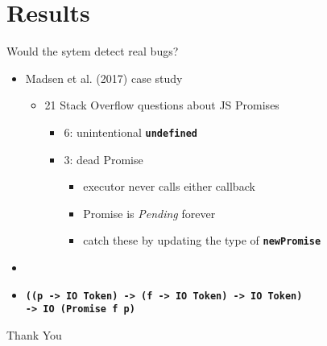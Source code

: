 \documentclass{beamer}
\newcommand{\lit}[1]{\textbf{\texttt{#1}}}
\begin{document}
\section{Results}

\begin{frame}
  \centering{\Large \insertsection}
\end{frame}


\begin{frame}
  \begin{block}{}
    Would the sytem detect real bugs?
  \end{block}
  \begin{itemize}
    \pause\item Madsen et al. (2017) case study
    \begin{itemize}
      \pause\item 21 Stack Overflow questions about JS Promises
      \begin{itemize}
      \pause\item 6: unintentional \lit{undefined} \pause {\huge
          \checkmark} \pause\item 3: dead Promise 
      \begin{itemize}
        \pause\item executor never calls either callback
        \pause\item Promise is \emph{Pending} forever
        \pause\item catch these by updating the type of \lit{newPromise}
      \end{itemize}
    \end{itemize}
    \end{itemize}
    \pause\item\item\lit{((p -> IO Token) -> (f -> IO Token) -> IO Token)\\
        \qquad  -> IO (Promise f p)}
  \end{itemize}
\end{frame}

\begin{frame}
  \center \huge Thank You
\end{frame}
\end{document}
